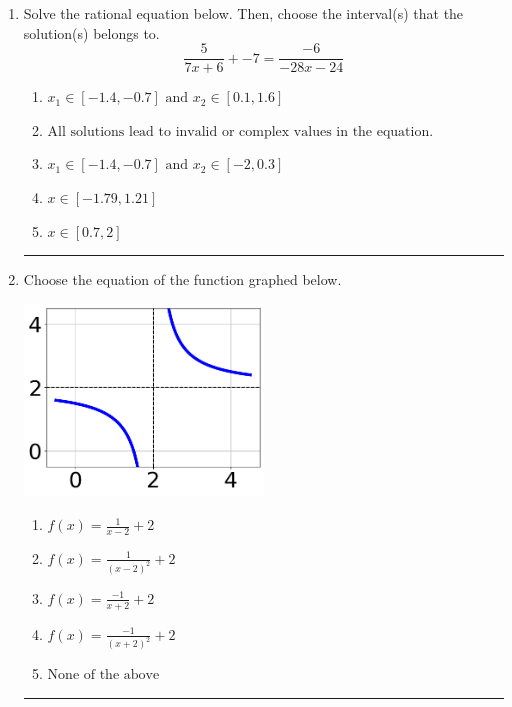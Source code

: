 \documentclass[14pt]{extbook}
\newcommand{\litem}[1]{\item#1\hspace*{-1cm}\rule{\textwidth}{0.4pt}}
\begin{document}
\begin{enumerate}
\litem{
Solve the rational equation below. Then, choose the interval(s) that the solution(s) belongs to.\[ \frac{5}{7x + 6} + -7 = \frac{-6}{-28x -24} \]\begin{enumerate}[label=\Alph*.]
\item \( x_1 \in [-1.4, -0.7] \text{ and } x_2 \in [0.1,1.6] \)
\item \( \text{All solutions lead to invalid or complex values in the equation.} \)
\item \( x_1 \in [-1.4, -0.7] \text{ and } x_2 \in [-2,0.3] \)
\item \( x \in [-1.79,1.21] \)
\item \( x \in [0.7,2] \)

\end{enumerate} }
\litem{
Choose the equation of the function graphed below.
\begin{center}
    \includegraphics[width=0.5\textwidth]{../Figures/rationalGraphToEquationC.png}
\end{center}
\begin{enumerate}[label=\Alph*.]
\item \( f(x) = \frac{1}{x - 2} + 2 \)
\item \( f(x) = \frac{1}{(x - 2)^2} + 2 \)
\item \( f(x) = \frac{-1}{x + 2} + 2 \)
\item \( f(x) = \frac{-1}{(x + 2)^2} + 2 \)
\item \( \text{None of the above} \)


\end{enumerate}}
\end{enumerate}
\end{document}
